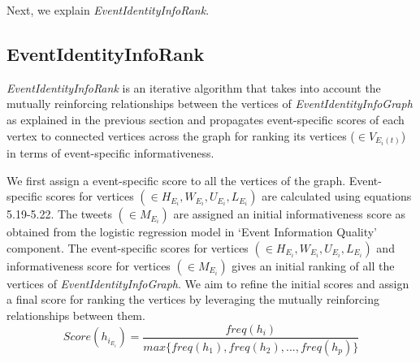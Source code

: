









Next, we explain \textit{EventIdentityInfoRank}.


\subsection{EventIdentityInfoRank\label{eventidentityinforank}}
\textit{EventIdentityInfoRank} is an iterative algorithm that takes into account the mutually reinforcing relationships between the vertices of \textit{EventIdentityInfoGraph} as explained in the previous section and propagates event-specific scores of each vertex to connected vertices across the graph for ranking its vertices ($\in V_{E_{i}(t)}$) in terms of event-specific informativeness.

We first assign a event-specific score to all the vertices of the graph. Event-specific scores for vertices $(\in H_{E_{i}}, W_{E_{i}}, U_{E_{i}}, L_{E_{i}})$ are calculated using equations 5.19-5.22. The tweets  $(\in M_{E_{i}})$ are assigned an initial informativeness score as obtained from the logistic regression model in `Event Information Quality' component. The event-specific scores for vertices $(\in H_{E_{i}}, W_{E_{i}}, U_{E_{i}}, L_{E_{i}})$ and informativeness score for vertices $(\in M_{E_{i}})$ gives an initial ranking of all the vertices of \textit{EventIdentityInfoGraph}. We aim to refine the initial scores and assign a final score for ranking the vertices by leveraging the mutually reinforcing relationships between them.
\begin{equation}
Score(h_{i_{E_{i}}}) = \frac{freq(h_{i})}{max\{freq(h_{1}),freq(h_{2}),...,freq(h_{p})\}}
\end{equation}

